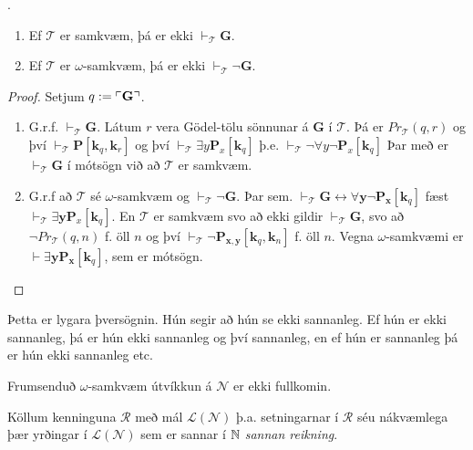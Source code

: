 \documentclass[12pt]{book}
\newcommand{\cT}{\mathcal{T}}
\newcommand{\cL}{\mathcal{L}}
\newcommand{\cN}{\mathcal{N}}
\newcommand{\cR}{\mathcal{R}}
\newcommand{\mb}[1]{\mathbf{#1}}
\newcommand{\bG}{\mathbf{G}}
\newcommand{\bx}{\mathbf{x}}
\newcommand{\bk}{\mathbf{k}}
\newcommand{\by}{\mathbf{y}}
\DeclarePairedDelimiter{\god}{\ulcorner}{\urcorner}
\begin{document}
\begin{setn}
  .
  \begin{enumerate}
  \item Ef $\cT$ er samkvæm, þá er ekki $\vdash_{\cT} \bG$.
  \item Ef $\cT$ er $\omega$-samkvæm, þá er ekki $\vdash_{\cT} \lnot \bG$.
  \end{enumerate}
\end{setn}

\begin{proof}
  Setjum $q := \god{\bG}$.
  \begin{enumerate}[(1)]
  \item G.r.f. $\vdash_{\cT} \bG$. Látum $r$ vera Gödel-tölu sönnunar á
    $\bG$ í $\cT$. Þá er $Pr_{\cT}(q,r)$ og því
    $\vdash_{\cT} \mb{P} [\bk_q, \bk_r]$ og því
    $\vdash_{\cT} \exists y \mb{P}_x [\bk_q]$ þ.e.
    $\vdash_{\cT} \lnot \forall y \lnot \mb{P}_x[\bk_q]$ Þar með er
    $\vdash_{\cT} \bG$ í mótsögn við að $\cT$ er samkvæm.


  \item G.r.f að $\cT$ sé $\omega$-samkvæm og  $\vdash_{\cT} \lnot \bG$. Þar sem.
    $\vdash_{\cT} \bG \leftrightarrow \forall \by \lnot \mb{P}_{\bx}[\bk_q]$ fæst
    $\vdash_{\cT} \exists \by \mb{P}_x[\bk_q]$.
    En $\cT$ er samkvæm svo að ekki gildir $\vdash_{\cT} \bG$, svo að
    $\lnot Pr_{\cT}(q,n)$ f. öll $n$ og því
    $\vdash_{\cT} \lnot \mb{P}_{\bx,\by}[\bk_q,\bk_n]$ f. öll $n$.
    Vegna $\omega$-samkvæmi er $\vdash \exists \by \mb{P}_{\bx}[\bk_q]$, sem er mótsögn.

  \end{enumerate}
\end{proof}

Þetta er lygara þversögnin. Hún segir að hún se ekki sannanleg.
Ef hún er ekki sannanleg, þá er hún ekki sannanleg og því sannanleg, en
ef hún er sannanleg þá er hún ekki sannanleg etc.




\begin{setn}[Fylgisetning]
Frumsenduð $\omega$-samkvæm útvíkkun á $\cN$ er ekki fullkomin.
\end{setn}

\begin{skgr}
  Köllum kenninguna $\cR$ með mál $\cL(\cN)$ þ.a. setningarnar í $\cR$
  séu nákvæmlega þær yrðingar í $\cL(\cN)$ sem er sannar í $\mathbb{N}$
  \emph{sannan reikning}.
\end{skgr}
\end{document}
